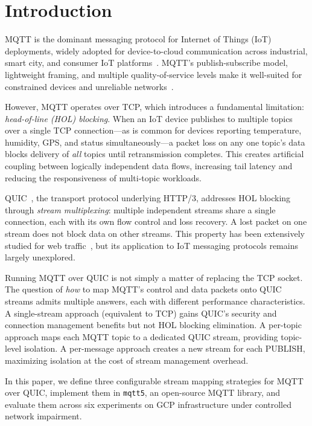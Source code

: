 \section{Introduction}
\label{sec:introduction}

MQTT is the dominant messaging protocol for Internet of Things (IoT) deployments, widely adopted for device-to-cloud communication across industrial, smart city, and consumer IoT platforms~\cite{bansal2020iot-mqtt-survey}. MQTT's publish-subscribe model, lightweight framing, and multiple quality-of-service levels make it well-suited for constrained devices and unreliable networks~\cite{mqtt-v5-spec}.

However, MQTT operates over TCP, which introduces a fundamental limitation: \emph{head-of-line (HOL) blocking}. When an IoT device publishes to multiple topics over a single TCP connection---as is common for devices reporting temperature, humidity, GPS, and status simultaneously---a packet loss on any one topic's data blocks delivery of \emph{all} topics until retransmission completes. This creates artificial coupling between logically independent data flows, increasing tail latency and reducing the responsiveness of multi-topic workloads.

QUIC~\cite{rfc9000}, the transport protocol underlying HTTP/3, addresses HOL blocking through \emph{stream multiplexing}: multiple independent streams share a single connection, each with its own flow control and loss recovery. A lost packet on one stream does not block data on other streams. This property has been extensively studied for web traffic~\cite{langley2017quic, kakhki2017quic, marx2020hol, yu2021quic}, but its application to IoT messaging protocols remains largely unexplored.

Running MQTT over QUIC is not simply a matter of replacing the TCP socket. The question of \emph{how} to map MQTT's control and data packets onto QUIC streams admits multiple answers, each with different performance characteristics. A single-stream approach (equivalent to TCP) gains QUIC's security and connection management benefits but not HOL blocking elimination. A per-topic approach maps each MQTT topic to a dedicated QUIC stream, providing topic-level isolation. A per-message approach creates a new stream for each PUBLISH, maximizing isolation at the cost of stream management overhead.

In this paper, we define three configurable stream mapping strategies for MQTT over QUIC, implement them in \texttt{mqtt5}, an open-source MQTT library, and evaluate them across six experiments on GCP infrastructure under controlled network impairment.

